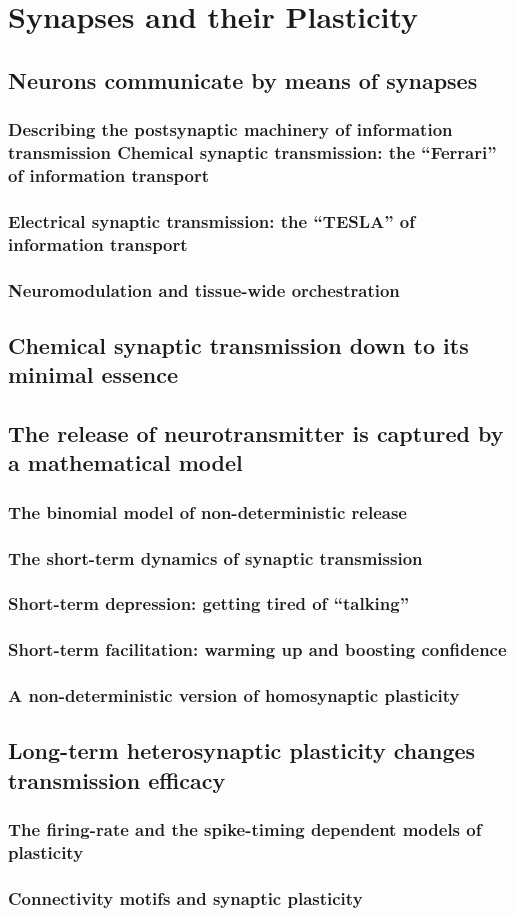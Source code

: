 \chapter{Synapses and their Plasticity}
\label{syn} %

\section{Neurons communicate by means of synapses}
	\subsection{Describing the postsynaptic machinery of information transmission Chemical synaptic transmission: the “Ferrari” of information transport}
	\subsection{Electrical synaptic transmission: the “TESLA” of information transport}
	\subsection{Neuromodulation and tissue-wide orchestration}
	\section{Chemical synaptic transmission down to its minimal essence}
	\section{The release of neurotransmitter is captured by a mathematical model }
		\subsection{The binomial model of non-deterministic release }
		\subsection{The short-term dynamics of synaptic transmission}
	\subsection{Short-term depression: getting tired of “talking”}
	\subsection{Short-term facilitation: warming up and boosting confidence}
	\subsection{A non-deterministic version of homosynaptic plasticity}
	    \section{Long-term heterosynaptic plasticity changes transmission efficacy}
		\subsection{The firing-rate and the spike-timing dependent models of plasticity}
		\subsection{Connectivity motifs and synaptic plasticity}
